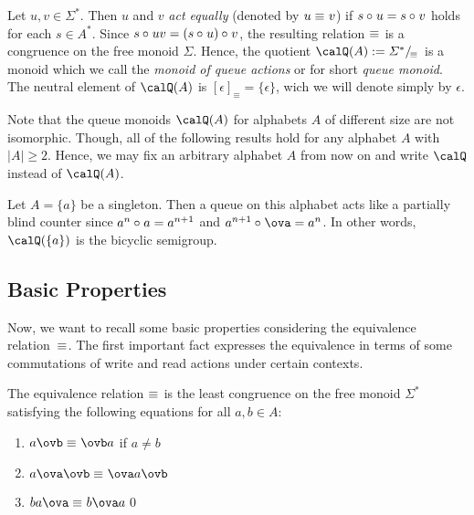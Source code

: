\begin{definition}
	Let $u,v\in\varSigma^*$. Then $u$ and $v$ \emph{act equally} (denoted by ${u\equiv_{} v}$) if $s\circ_{} u=s\circ_{} v$ holds for each $s\in A^*$.
	Since $s\circ_{} uv=(s\circ_{} u)\circ_{} v$, the resulting relation $\equiv_{}$
	is a congruence on the free monoid $\varSigma$. Hence, the
	quotient $\Qx(A):=\partition{\varSigma^*}{\equivx}$ is a monoid
	which we call the \emph{monoid of queue actions} or for short \emph{queue monoid}. 
	The neutral element of $\Qx(A)$ is $[\epsilon]_\equiv = \{\epsilon\}$, wich we will denote simply by $\epsilon$.
\end{definition}

Note that the queue monoids $\Qx(A)$ for alphabets $A$ of different size are not isomorphic. Though, all of the following results hold for any alphabet $A$ with $|A|\geq2$. Hence, we may fix an arbitrary alphabet $A$ from now on and write $\Qx$ instead of $\Qx(A)$.

\begin{remark}
	Let $A=\{a\}$ be a singleton. Then a queue on this alphabet acts like a partially blind counter since $a^n\circ_{} a=a^{n+1}$ and $a^{n+1}\opx\ova=a^n$. In other words, $\Qx(\{a\})$ is the bicyclic semigroup.
\end{remark}

\subsection{Basic Properties}
Now, we want to recall some basic properties considering the equivalence relation~$\equiv_{}$. The first important fact expresses the equivalence in terms of some commutations of write and read actions under certain contexts.

\begin{theorem}\label{thm:equiv}
	The equivalence relation $\equiv_{}$ is the least congruence on the free monoid $\varSigma^*$ satisfying the following equations for all $a,b\in A$:
	\begin{enumerate}[(1)]
		\item $a\ovb\equivx\ovb a$ if $a\neq b$\label{thm:equiv:i1}
		\item $a\ova\ovb\equivx\ova a\ovb$\label{thm:equiv:i2}
		\item $ba\ova\equivx b\ova a$\label{thm:equiv:i3}\qed
	\end{enumerate}
\end{theorem}

